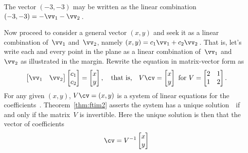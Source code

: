 \begin{example}
\begin{solution}
\begin{parts}
\item The vector \((-3,-3)\) may be written as the linear combination
\((-3,-3)=-\vv_1-\vv_2\)\,. 

\end{parts}

Now proceed to consider a general vector \((x,y)\) and seek it as a linear combination of~\(\vv_1\) and~\(\vv_2\), namely \((x,y)=c_1\vv_1+c_2\vv_2\)\,.
That is, let's write each and every point in the plane as a linear combination of~\(\vv_1\) and~\(\vv_2\) as illustrated in the margin.
%
Rewrite the equation in matrix-vector form as
\begin{equation*}
\begin{bmatrix} \vv_1&\vv_2 \end{bmatrix}
\begin{bmatrix} c_1\\c_2 \end{bmatrix}
=\begin{bmatrix} x\\y \end{bmatrix}
,\quad\text{that is,}\quad
V\cv=\begin{bmatrix} x\\y \end{bmatrix}
\text{ for }V=\begin{bmatrix} 2&1\\1&2 \end{bmatrix}.
\end{equation*}
For any given \((x,y)\), \(V\cv=(x,y)\) is a system of linear equations for the coefficients~\cv.
Theorem~\ref{thm:ftim2} asserts the system has a unique solution~\cv\ if and only if the matrix~\(V\) is invertible.
Here the unique solution is then that the vector of coefficients
\begin{equation*}
\cv=V^{-1}\begin{bmatrix} x\\y \end{bmatrix}

\end{equation*}
\end{solution}
\end{example}
